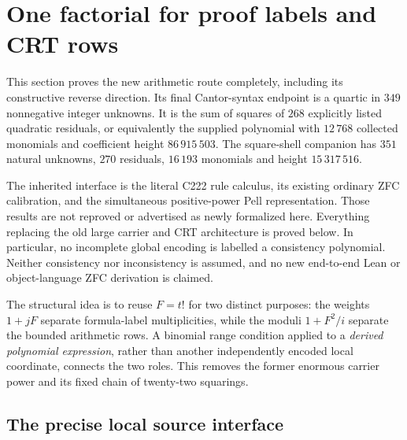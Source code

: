 \section{One factorial for proof labels and CRT rows}
\label{sec:shared-factorial-carrier}

This section proves the new arithmetic route completely, including its
constructive reverse direction.  Its final Cantor-syntax endpoint is a
quartic in \(349\) nonnegative integer unknowns.  It is the sum of squares
of \(268\) explicitly listed quadratic residuals, or equivalently the
supplied polynomial with \(12\,768\) collected monomials and coefficient
height \(86\,915\,503\).  The square-shell companion has \(351\) natural
unknowns, \(270\) residuals, \(16\,193\) monomials and height
\(15\,317\,516\).

The inherited interface is the literal C222 rule calculus, its existing
ordinary ZFC calibration, and the simultaneous positive-power Pell
representation.  Those results are not reproved or advertised as newly
formalized here.  Everything replacing the old large carrier and CRT
architecture is proved below.  In particular, no incomplete global
encoding is labelled a consistency polynomial.  Neither consistency nor
inconsistency is assumed, and no new end-to-end Lean or object-language
ZFC derivation is claimed.

The structural idea is to reuse \(F=t!\) for two distinct purposes:
the weights \(1+jF\) separate formula-label multiplicities, while the
moduli \(1+F^2/i\) separate the bounded arithmetic rows.  A binomial range
condition applied to a \emph{derived polynomial expression}, rather
than another independently encoded local coordinate, connects the two
roles.  This removes the former enormous carrier power and its fixed
chain of twenty-two squarings.

\subsection{The precise local source interface}

